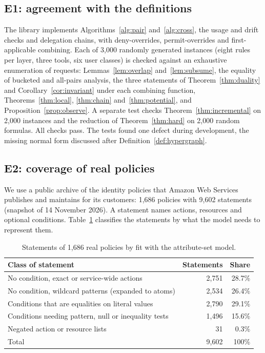 \documentclass[preprint,12pt]{elsarticle}
\theoremstyle{definition}
\theoremstyle{remark}
\begin{document}
\subsection{E1: agreement with the definitions}
The library implements Algorithms~\ref{alg:pair} and~\ref{alg:cross}, the usage and drift checks and delegation chains, with deny-overrides, permit-overrides and first-applicable combining. Each of 3,000 randomly generated instances (eight rules per layer, three tools, six user classes) is checked against an exhaustive enumeration of requests: Lemmas~\ref{lem:overlap} and~\ref{lem:subsume}, the equality of bucketed and all-pairs analysis, the three statements of Theorem~\ref{thm:duality} and Corollary~\ref{cor:invariant} under each combining function, Theorems~\ref{thm:local}, \ref{thm:chain} and~\ref{thm:potential}, and Proposition~\ref{prop:observe}. A separate test checks Theorem~\ref{thm:incremental} on 2,000 instances and the reduction of Theorem~\ref{thm:hard} on 2,000 random formulas. All checks pass. The tests found one defect during development, the missing normal form discussed after Definition~\ref{def:hypergraph}.

\subsection{E2: coverage of real policies}
We use a public archive of the identity policies that Amazon Web Services publishes and maintains for its customers: 1,686 policies with 9,602 statements (snapshot of 14 November 2026). A statement names actions, resources and optional conditions. Table~\ref{tab:fit} classifies the statements by what the model needs to represent them.

\begin{table}[t]
\caption{Statements of 1,686 real policies by fit with the attribute-set model.}\label{tab:fit}
\centering\small
\begin{tabular}{@{}lrr@{}}
\toprule
Class of statement & Statements & Share \\
\midrule
No condition, exact or service-wide actions & 2,751 & 28.7\% \\
No condition, wildcard patterns (expanded to atoms) & 2,534 & 26.4\% \\
Conditions that are equalities on literal values & 2,790 & 29.1\% \\
Conditions needing pattern, null or inequality tests & 1,496 & 15.6\% \\
Negated action or resource lists & 31 & 0.3\% \\
\midrule
Total & 9,602 & 100\% \\
\bottomrule
\end{tabular}
\end{table}
\end{document}
